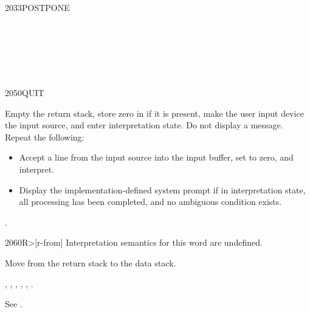 \begin{worddef}{2033}{POSTPONE}
	\begin{testing} %
		 \\
		 \\

		 \\
		 \\
	\end{testing}
\end{worddef}


\begin{worddef}{2050}{QUIT}
\item \stack{}{}

	Empty the return stack, store zero in  if it is
	present, make the user input device the input source, and enter
	interpretation state. Do not display a message. Repeat the
	following:
	\begin{itemize}
	\item Accept a line from the input source into the input buffer,
		set  to zero, and interpret.
	\item Display the implementation-defined system prompt if in
		interpretation state, all processing has been completed,
		and no ambiguous condition exists.
	\end{itemize}

\see {}.
\end{worddef}


\begin{worddef}[Rfrom]{2060}{R>}[r-from]
\interpret
	Interpretation semantics for this word are undefined.

\execute

	Move  from the return stack to the data stack.

\see {},
	,
	,
	,
	,
	.

	\begin{testing} %
		See .
	\end{testing}
\end{worddef}


